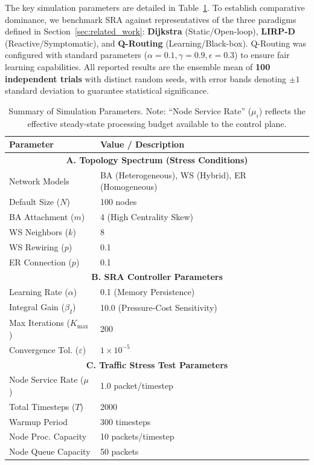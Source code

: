 \documentclass{ccjnl}
\begin{document}
The key simulation parameters are detailed in Table~\ref{tab:sim_params}.
To establish comparative dominance, we benchmark SRA against representatives of the three paradigms defined in Section~\ref{sec:related_work}:
\textbf{Dijkstra} (Static/Open-loop), \textbf{LIRP-D} (Reactive/Symptomatic), and \textbf{Q-Routing} (Learning/Black-box).
Q-Routing was configured with standard parameters ($\alpha=0.1, \gamma=0.9, \epsilon=0.3$) to ensure fair learning capabilities.
All reported results are the ensemble mean of \textbf{100 independent trials} with distinct random seeds, with error bands denoting $\pm1$ standard deviation to guarantee statistical significance.

\begin{table}[t!]
\centering
\caption{Summary of Simulation Parameters. Note: ``Node Service Rate'' ($\mu_i$) reflects the effective steady-state processing budget available to the control plane.}
\label{tab:sim_params}
\renewcommand{\arraystretch}{1.2}
\small
\begin{tabularx}{\columnwidth}{|l|X|}
\hline
\textbf{Parameter} & \textbf{Value / Description} \\
\hline
\hline
\multicolumn{2}{|c|}{\textbf{A. Topology Spectrum (Stress Conditions)}} \\
\hline
Network Models & BA (Heterogeneous), WS (Hybrid), ER (Homogeneous) \\
\hline
Default Size ($N$) & 100 nodes \\
\hline
BA Attachment ($m$) & 4 (High Centrality Skew) \\
\hline
WS Neighbors ($k$) & 8 \\
\hline
WS Rewiring ($p$) & 0.1 \\
\hline
ER Connection ($p$) & 0.1 \\
\hline
\hline
\multicolumn{2}{|c|}{\textbf{B. SRA Controller Parameters}} \\
\hline
Learning Rate ($\alpha$) & 0.1 (Memory Persistence) \\
\hline
Integral Gain ($\beta_I$) & 10.0 (Pressure-Cost Sensitivity) \\
\hline
Max Iterations ($K_{\max}$) & 200 \\
\hline
Convergence Tol. ($\varepsilon$) & $1 \times 10^{-5}$ \\
\hline
\hline
\multicolumn{2}{|c|}{\textbf{C. Traffic Stress Test Parameters}} \\
\hline
Node Service Rate ($\mu$) & 1.0 packet/timestep \\
\hline
Total Timesteps ($T$) & 2000 \\
\hline
Warmup Period & 300 timesteps \\
\hline
Node Proc. Capacity & 10 packets/timestep \\
\hline
Node Queue Capacity & 50 packets \\
\hline
\end{tabularx}
\end{table}
\end{document}
